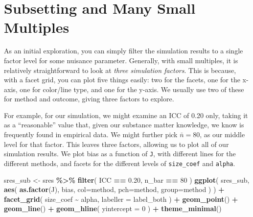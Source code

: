 \documentclass[
]{book}
\newenvironment{Shaded}{\begin{snugshade}}{\end{snugshade}}
\newcommand{\AttributeTok}[1]{\textcolor[rgb]{0.13,0.29,0.53}{#1}}
\newcommand{\DecValTok}[1]{\textcolor[rgb]{0.00,0.00,0.81}{#1}}
\newcommand{\FloatTok}[1]{\textcolor[rgb]{0.00,0.00,0.81}{#1}}
\newcommand{\FunctionTok}[1]{\textcolor[rgb]{0.13,0.29,0.53}{\textbf{#1}}}
\newcommand{\NormalTok}[1]{#1}
\newcommand{\OtherTok}[1]{\textcolor[rgb]{0.56,0.35,0.01}{#1}}
\newcommand{\SpecialCharTok}[1]{\textcolor[rgb]{0.81,0.36,0.00}{\textbf{#1}}}
\begin{document}
\section{Subsetting and Many Small Multiples}\label{subsetting-and-many-small-multiples}

As an initial exploration, you can simply filter the simulation results to a single factor level for some nuisance parameter.
Generally, with small multiples, it is relatively straightforward to look at \emph{three simulation factors}.
This is because, with a facet grid, you can plot five things easily: two for the facets, one for the x-axis, one for color/line type, and one for the y-axis.
We usually use two of these for method and outcome, giving three factors to explore.

For example, for our simulation, we might examine an ICC of 0.20 only, taking it as a ``reasonable'' value that, given our substance matter knowledge, we know is frequently found in empirical data.
We might further pick \(\bar{n} = 80\), as our middle level for that factor.
This leaves three factors, allowing us to plot all of our simulation results.
We plot bias as a function of \texttt{J}, with different lines for the different methods, and facets for the different levels of \texttt{size\_coef} and \texttt{alpha}.

\begin{Shaded}
\begin{Highlighting}[]
\NormalTok{sres\_sub }\OtherTok{\textless{}{-}}\NormalTok{ sres }\SpecialCharTok{\%\textgreater{}\%}
  \FunctionTok{filter}\NormalTok{( ICC }\SpecialCharTok{==} \FloatTok{0.20}\NormalTok{, n\_bar }\SpecialCharTok{==} \DecValTok{80}\NormalTok{ )}
\FunctionTok{ggplot}\NormalTok{( sres\_sub, }\FunctionTok{aes}\NormalTok{( }\FunctionTok{as.factor}\NormalTok{(J), bias, }
                       \AttributeTok{col=}\NormalTok{method, }\AttributeTok{pch=}\NormalTok{method, }\AttributeTok{group=}\NormalTok{method ) ) }\SpecialCharTok{+}
  \FunctionTok{facet\_grid}\NormalTok{( size\_coef }\SpecialCharTok{\textasciitilde{}}\NormalTok{ alpha, }\AttributeTok{labeller =}\NormalTok{ label\_both ) }\SpecialCharTok{+}
  \FunctionTok{geom\_point}\NormalTok{() }\SpecialCharTok{+} \FunctionTok{geom\_line}\NormalTok{() }\SpecialCharTok{+}
  \FunctionTok{geom\_hline}\NormalTok{( }\AttributeTok{yintercept =} \DecValTok{0}\NormalTok{ ) }\SpecialCharTok{+}
  \FunctionTok{theme\_minimal}\NormalTok{() }
\end{Highlighting}
\end{Shaded}
\end{document}
